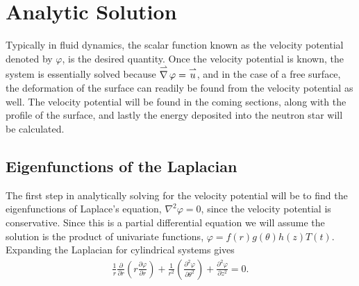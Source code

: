 %
%
%
%
%
%
%
%
%

\chapter{Analytic Solution}
\label{chap:analytic}

Typically in fluid dynamics, the scalar function known as the velocity potential denoted by $\varphi$, is the desired quantity. Once the velocity potential is known, the system is essentially solved because  $\operatorname{\overset{\rightharpoonup}\nabla} \varphi = \overset{\rightharpoonup}u$, and in the case of a free surface, the deformation of the surface can readily be found from the velocity potential as well. The velocity potential will be found in the coming sections, along with the profile of the surface, and lastly the energy deposited into the neutron star will be calculated.

\section{Eigenfunctions of the Laplacian}

The first step in analytically solving for the velocity potential will be to find the eigenfunctions of Laplace's equation, $\nabla^2 \varphi = 0$, since the velocity potential is conservative. Since this is a partial differential equation we will assume the solution is the product of univariate functions, $\varphi = f(r) g(\theta) h(z) T(t)$. Expanding the Laplacian for cylindrical systems gives 
\begin{align*}
\frac{1}{r}\frac{\partial}{\partial r} \left( r \frac{\partial \varphi}{\partial r} \right) + \frac{1}{r^2} \left( \frac{\partial^2 \varphi}{\partial \theta^2} \right) + \frac{\partial^2 \varphi}{\partial z^2} = 0.
\end{align*}

